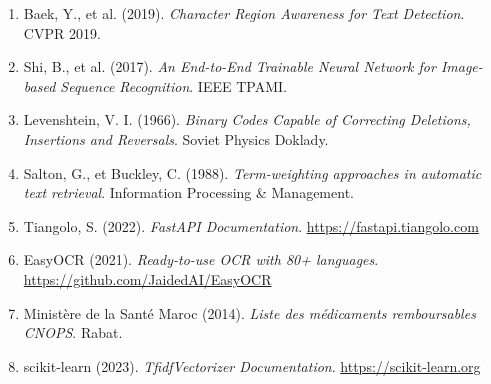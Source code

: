 \documentclass[12pt,a4paper]{report}
\begin{document}
\begin{enumerate}
  \item Baek, Y., et al. (2019). \textit{Character Region Awareness for Text Detection}. CVPR 2019.
  \item Shi, B., et al. (2017). \textit{An End-to-End Trainable Neural Network for Image-based Sequence Recognition}. IEEE TPAMI.
  \item Levenshtein, V. I. (1966). \textit{Binary Codes Capable of Correcting Deletions, Insertions and Reversals}. Soviet Physics Doklady.
  \item Salton, G., et Buckley, C. (1988). \textit{Term-weighting approaches in automatic text retrieval}. Information Processing \& Management.
  \item Tiangolo, S. (2022). \textit{FastAPI Documentation}. \url{https://fastapi.tiangolo.com}
  \item EasyOCR (2021). \textit{Ready-to-use OCR with 80+ languages}. \url{https://github.com/JaidedAI/EasyOCR}
  \item Minist\`ere de la Sant\'e Maroc (2014). \textit{Liste des m\'edicaments remboursables CNOPS}. Rabat.
  \item scikit-learn (2023). \textit{TfidfVectorizer Documentation}. \url{https://scikit-learn.org}
\end{enumerate}
\end{document}
